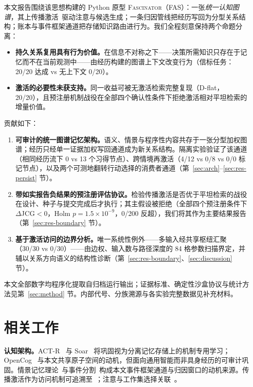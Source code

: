 \documentclass[10pt,a4paper]{ctexart}
\begin{document}
本文报告围绕该思想构建的 Python 原型 \textsc{Fascinator}（FAS）：一张\emph{统一认知图谱}，其上传播激活~\citep{collins1975spreading}驱动注意与候选生成；一条归因管线把经历写回为分型关系结构；账本与事件框架通道把存储知识路由进行为。我们全程刻意保持两个命题分离：

\begin{itemize}
\item[(a)] \textbf{持久关系复用具有行为价值。}在信息不对称之下——决策所需知识只存在于记忆而不在当前观测中——由经历构建的图谱上下文改变行为（信标任务：20/20 达成 vs 无上下文 0/20）。
\item[(b)] \textbf{激活的必要性未获支持。}同一收益可被无激活检索完整复现（D-flat，20/20），且预注册机制战役在全部四个确认性条件下拒绝激活相对平坦检索的增量价值。
\end{itemize}

贡献如下：
\begin{enumerate}
\item \textbf{可审计的统一图谱记忆架构。}语义、情景与程序性内容共存于一张分型加权图谱；经历只经单一证据加权写回通道成为新关系结构。隔离实验验证了该通道（相同经历流下 0 vs 13 个习得节点）、跨情境再激活（4/12 vs 0/8 vs 0/0 标记节点），以及两个可测地翻转行动选择的消费者通道（第~\ref{sec:arch}--\ref{sec:res-persist} 节）。
\item \textbf{带如实报告负结果的预注册评估协议。}检验传播激活是否优于平坦检索的战役在设计、种子与提交完成后才执行；其主假设被拒绝（全部四个预注册条件下 $\Delta$JCG${<}0$，Holm $p{=}1.5\times10^{-9}$，0/200 反超），我们将其作为主要结果报告（第~\ref{sec:res-boundary} 节）。
\item \textbf{基于激活访问的边界分析。}唯一系统性例外——多输入经共享枢纽汇聚（30/30 vs 0/30）——由边权、输入数与路径深度的 84 格参数扫描界定，并辅以关系方向语义的结构性诊断（第~\ref{sec:res-boundary}、\ref{sec:discussion} 节）。
\end{enumerate}

本文全部数字均程序化提取自归档运行输出；证据标准、确定性沙盒协议与统计方法见第~\ref{sec:method} 节。内部代号、分族溯源与各实验完整数据见补充材料。

\section{相关工作}
\label{sec:related}

\textbf{认知架构。}ACT-R~\citep{anderson2004integrated} 与 Soar~\citep{laird2012soar} 将巩固视为分离记忆存储上的机制专用学习；OpenCog~\citep{hart2008opencog} 与本文共享原子空间的动机，但面向通用智能而非具身经历的可审计巩固。情景记忆理论~\citep{tulving1983elements,baddeley2000episodic}与事件分割~\citep{zacks2007event,schacter2007remembering}构成本文事件框架通道与归因窗口的动机来源。传播激活作为访问机制可追溯至~\citet{collins1975spreading}；注意与工作集选择关联~\citet{itti2001computational,posner1980orienting,cowan2001magical}。
\end{document}

